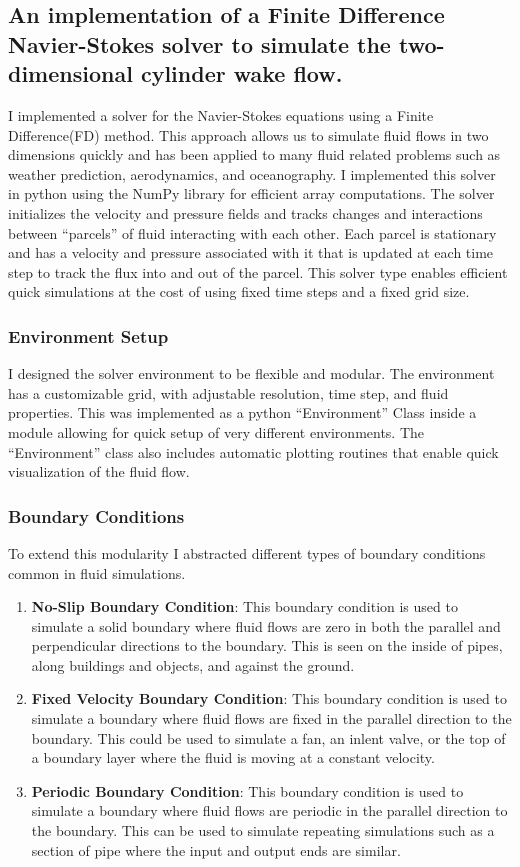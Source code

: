 

\subsection{An implementation of a Finite Difference Navier-Stokes solver to simulate the two-dimensional cylinder wake flow.}
I implemented a solver for the Navier-Stokes equations using a Finite Difference(FD) method.
This approach allows us to simulate fluid flows in two dimensions quickly and has been applied to many fluid related problems such as weather prediction, aerodynamics, and oceanography.
I implemented this solver in python using the NumPy library for efficient array computations.
The solver initializes the velocity and pressure fields and tracks changes and interactions between ``parcels'' of fluid interacting with each other.
Each parcel is stationary and has a velocity and pressure associated with it that is updated at each time step to track the flux into and out of the parcel.
This solver type enables efficient quick simulations at the cost of using fixed time steps and a fixed grid size.


\subsubsection{Environment Setup}
I designed the solver environment to be flexible and modular.
The environment has a customizable grid, with adjustable resolution, time step, and fluid properties.
This was implemented as a python ``Environment'' Class inside a module allowing for quick setup of very different environments.
The ``Environment'' class also includes automatic plotting routines that enable quick visualization of the fluid flow.

\subsubsection{Boundary Conditions}
To extend this modularity I abstracted different types of boundary conditions common in fluid simulations.

\begin{enumerate}
    \item \textbf{No-Slip Boundary Condition}: This boundary condition is used to simulate a solid boundary where fluid flows are zero in both the parallel and perpendicular directions to the boundary. This is seen on the inside of pipes, along buildings and objects, and against the ground.
    \item \textbf{Fixed Velocity Boundary Condition}: This boundary condition is used to simulate a boundary where fluid flows are fixed in the parallel direction to the boundary. This could be used to simulate a fan, an inlent valve, or the top of a boundary layer where the fluid is moving at a constant velocity.
    \item \textbf{Periodic Boundary Condition}: This boundary condition is used to simulate a boundary where fluid flows are periodic in the parallel direction to the boundary. This can be used to simulate repeating simulations such as a section of pipe where the input and output ends are similar.
\end{enumerate}

